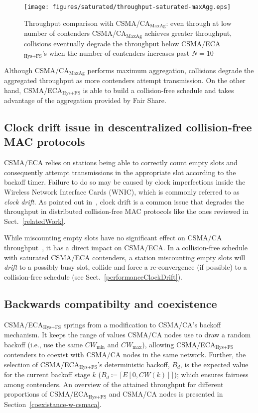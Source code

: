 \documentclass[a4paper,journal]{IEEEtran}
\begin{document}
	\begin{figure}[tb]
	\centering
		\texttt{[image: figures/saturated/throughput-saturated-maxAgg.eps]}
		\caption{Throughput comparison with CSMA/CA$_{\text{MaxAg}}$: even through at low number of contenders CSMA/CA$_{\text{MaxAg}}$ achieves greater throughput, collisions eventually degrade the throughput below CSMA/ECA$_{\text{Hys+FS}}$'s when the number of contenders increases past $N=10$}
		\label{fig:ECA-vs-DCF-maxAgg}
	\end{figure}

	Although CSMA/CA$_{\text{MaxAg}}$ performs maximum aggregation, collisions degrade the aggregated throughput as more contenders attempt transmission. On the other hand, CSMA/ECA$_{\text{Hys+FS}}$ is able to build a collision-free schedule and takes advantage of the aggregation provided by Fair Share.
	
	\subsection{Clock drift issue in descentralized collision-free MAC protocols}\label{clockDrift-issue}
	CSMA/ECA relies on stations being able to correctly count empty slots and consequently attempt transmissions in the appropriate slot according to the backoff timer. Failure to do so may be caused by clock imperfections inside the Wireless Network Interface Cards (WNIC), which is commonly referred to as \emph{clock drift}. As pointed out in~\cite{slotDrift}, clock drift is a common issue that degrades the throughput in distributed collision-free MAC protocols like the ones reviewed in Sect.~\ref{relatedWork}.
	
	While miscounting empty slots have no significant effect on CSMA/CA throughput~\cite{slotDrift}, it has a direct impact on CSMA/ECA. In a collision-free schedule with saturated CSMA/ECA contenders, a station miscounting empty slots will \emph{drift} to a possibly busy slot, collide and force a re-convergence (if possible) to a collision-free schedule (see Sect.~\ref{performanceClockDrift}).
	
	\subsection{Backwards compatibilty and coexistence}
	CSMA/ECA$_{\text{Hys+FS}}$ springs from a modification to CSMA/CA's backoff mechanism. It keeps the range of values CSMA/CA nodes use to draw a random backoff (i.e., use the same $CW_{\min}$ and $CW_{\max}$), allowing CSMA/ECA$_{\text{Hys+FS}}$ contenders to coexist with CSMA/CA nodes in the same network. Further, the selection of CSMA/ECA$_{\text{Hys+FS}}$'s deterministic backoff, $B_d$, is the expected value for the current backoff stage $k$ ($B_d\coloneqq\lceil{E[0,CW(k)]}\rceil$); which ensures fairness among contenders. An overview of the attained throughput for different proportions of CSMA/ECA$_{\text{Hys+FS}}$ and CSMA/CA nodes is presented in Section~\ref{coexistance-w-csmaca}.
	
\end{document}
